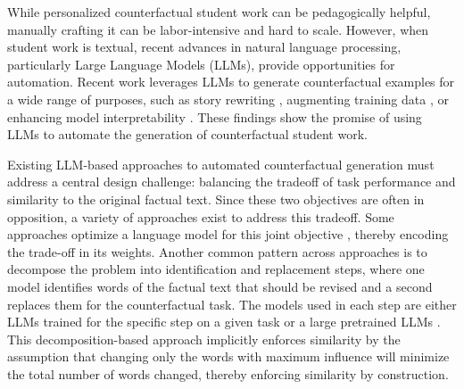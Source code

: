 \documentclass[11pt]{article}
\begin{document}
While personalized counterfactual student work can be pedagogically helpful, manually crafting it can be labor-intensive and hard to scale. However, when student work is textual, recent advances in natural language processing, particularly Large Language Models (LLMs), provide opportunities for automation. Recent work leverages LLMs to generate counterfactual examples for a wide range of purposes, such as story rewriting \cite{chen_unsupervised_2022}, augmenting training data \cite{qiu_paircfr_2024, zhang_dually_2025}, or enhancing model interpretability \cite{ross-etal-2021-explaining}. These findings show the promise of using LLMs to automate the generation of counterfactual student work. 



Existing LLM-based approaches to automated counterfactual generation must address a central design challenge: balancing the tradeoff of task performance and similarity to the original factual text. Since these two objectives are often in opposition, a variety of approaches exist to address this tradeoff. Some approaches optimize a language model for this joint objective \cite{jung_counterfactual_2022,hu_causal_2021,dathathri_plug_2019}, thereby encoding the trade-off in its weights. Another common pattern across approaches is to decompose the problem into identification and replacement steps, where one model identifies words of the factual text that should be revised and a second replaces them for the counterfactual task. The models used in each step are either LLMs trained for the specific step on a given task \cite{ross-etal-2021-explaining,treviso_crest_2023} or a large pretrained LLMs \cite{chen_disco_2023, dixit_core_2022, sachdeva_catfood_2024, wang_fitcf_2025}. This decomposition-based approach implicitly enforces similarity by the assumption that changing only the words with maximum influence will minimize the total number of words changed, thereby enforcing similarity by construction. 
\end{document}
